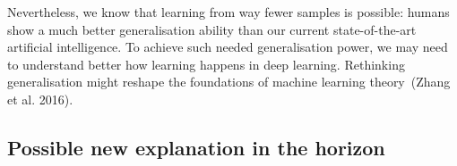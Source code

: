 \documentclass[
  letterpaper,
  12pt,
  british]{tufte-book}
\theoremstyle{plain}
\theoremstyle{definition}
\theoremstyle{plain}
\theoremstyle{remark}
\begin{document}
Nevertheless, we know that learning from way fewer samples is possible:
humans show a much better generalisation ability than our current
state-of-the-art artificial intelligence. To achieve such needed
generalisation power, we may need to understand better how learning
happens in deep learning. Rethinking generalisation might reshape the
foundations of machine learning theory~(Zhang et al.
2016).

\hypertarget{possible-new-explanation-in-the-horizon}{%
\subsection{Possible new explanation in the
horizon}\label{possible-new-explanation-in-the-horizon}}
\end{document}
